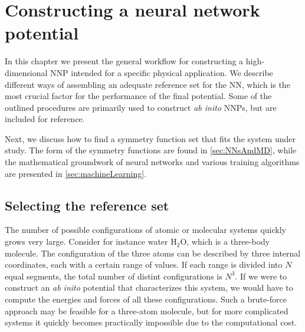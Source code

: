 \documentclass[twoside,english]{uiofysmaster}
\begin{document}
\chapter{Constructing a neural network potential} \label{sec:constructingNNP}
In this chapter we present the general workflow for constructing a high-dimensional NNP 
intended for a specific physical application. We describe different ways of assembling 
an adequate reference set for the NN, which is the most crucial factor for the performance of 
the final potential. Some of the outlined procedures are primarily used to construct 
\textit{ab inito} NNPs, but are included for reference. 

Next, we discuss how to find a symmetry function set that fits the system under study.
The form of the symmetry functions are found in \autoref{sec:NNsAndMD}, while
the mathematical groundwork of neural networks and various training algorithms are presented in \autoref{sec:machineLearning}.



\section{Selecting the reference set} \label{sec:selectingTrainingData}
The number of possible configurations of atomic or molecular systems quickly grows very large. 
Consider for instance water $\textrm{H}_2\textrm{O}$, which is a three-body molecule. The configuration of the
three atoms can be described by three internal coordinates, each with a certain range of values. 
If each range is divided into $N$ equal segments, the total number of distint configurations is $N^3$. 
If we were to construct an \textit{ab inito} potential that characterizes this system, we would have to compute the energies 
and forces of all these configurations. 
Such a brute-force approach may be feasible for a three-atom molecule, but for more complicated systems
it quickly becomes practically impossible due to the computational cost. 
\end{document}
